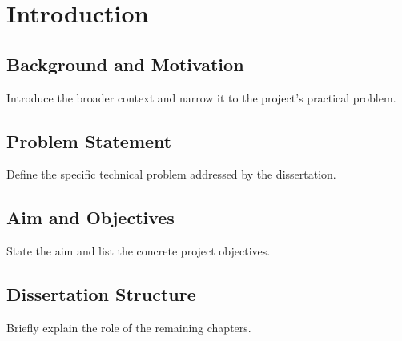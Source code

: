\chapter{Introduction}

\section{Background and Motivation}
Introduce the broader context and narrow it to the project's practical problem.

\section{Problem Statement}
Define the specific technical problem addressed by the dissertation.

\section{Aim and Objectives}
State the aim and list the concrete project objectives.

\section{Dissertation Structure}
Briefly explain the role of the remaining chapters.
